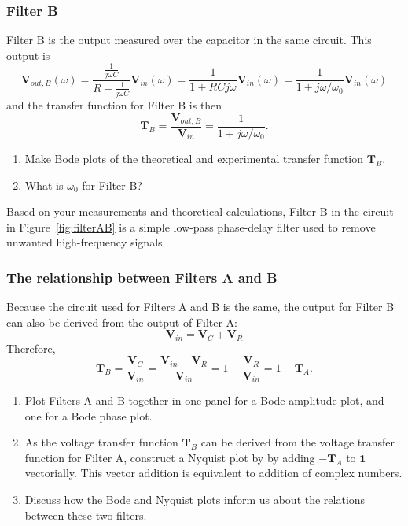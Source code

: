 \documentclass{article}
\begin{document}
\subsubsection*{Filter B}
Filter B is the output measured over the capacitor in the same
circuit.  This output is
\begin{equation}
  \mathbf{V}_{out, B}(\omega)={\frac {\frac {1}{j\omega C}}{R+{\frac {1}{j\omega C}}}}\mathbf{V}_{in}(\omega)={\frac {1}{1+RCj\omega}}\mathbf{V}_{in}(\omega) =
  {\frac {1}{1+j\omega/\omega_0}}\mathbf{V}_{in}(\omega)
\end{equation}
and the transfer function for Filter B is then
\begin{equation}
  \mathbf{T}_B =
  \frac{\mathbf{V}_{out, B}}{\mathbf{V}_{in}}=
  \frac{1}{1+j\omega/\omega_0}.
\end{equation}
\begin{enumerate}
\item Make Bode plots of the theoretical and experimental transfer
  function $\mathbf{T}_B$.
\item What is $\omega_0$ for Filter B? 
\end{enumerate}
Based on your measurements and theoretical calculations, Filter B in
the circuit in Figure~\ref{fig:filterAB} is a simple low-pass
phase-delay filter used to remove unwanted high-frequency signals.

\subsubsection*{The relationship between Filters A and B}
Because the circuit used for Filters A and B is the same, the output for
Filter B can also be derived from the output of Filter A:
\begin{equation}
  \mathbf{V}_{in}=\mathbf{V}_C+\mathbf{V}_R
\end{equation}
Therefore,
\begin{equation}
  \mathbf{T}_B =\frac{\mathbf{V}_C}{\mathbf{V}_{in}}
  =\frac{\mathbf{V}_{in}-\mathbf{V}_R}{\mathbf{V}_{in}}
  =1-\frac{\mathbf{V}_R}{\mathbf{V}_{in}}
  =1-\mathbf{T}_A.
\end{equation}

\begin{enumerate}
\item Plot Filters A and B together in one panel for a Bode amplitude
  plot, and one for a Bode phase plot.
\item As the voltage transfer function $\mathbf{T}_B$ can be derived
  from the voltage transfer function for Filter A, construct a Nyquist
  plot by by adding $-\mathbf{T}_A$ to $\mathbf{1}$ vectorially. This
  vector addition is equivalent to addition of complex numbers.
\item Discuss how the Bode and Nyquist plots inform us about the relations
  between these two filters.
\end{enumerate}
\end{document}
